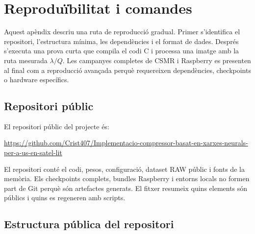 \chapter{Reproduïbilitat i comandes}\label{app:reproducibility}
\fancyhead[LO]{\slshape \textsf{\nouppercase \rightmark}}

Aquest apèndix descriu una ruta de reproducció gradual. Primer s'identifica el
repositori, l'estructura mínima, les dependències i el format de dades. Després
s'executa una prova curta que compila el codi C i processa una imatge amb la
ruta mesurada \(\lambda/Q\). Les campanyes completes de CSMR i Raspberry es
presenten al final com a reproducció avançada perquè requereixen dependències,
checkpoints o hardware específics.

\section{Repositori públic}

El repositori públic del projecte és:

\begin{center}
\url{https://github.com/Crist407/Implementacio-compressor-basat-en-xarxes-neurals-per-a-us-en-satel-lit}
\end{center}

El repositori conté el codi, pesos, configuració, dataset RAW públic i fonts de
la memòria. Els checkpoints complets, bundles Raspberry i entorns locals no
formen part de Git perquè són artefactes generats. El fitxer
 resumeix quins elements són públics i quins es
regeneren amb scripts.

\section{Estructura pública del repositori}

